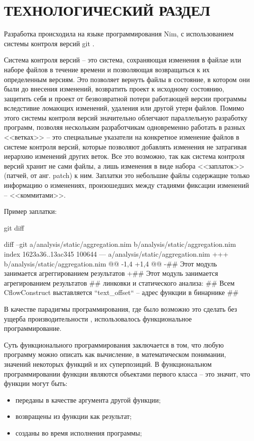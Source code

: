 \chapter{ТЕХНОЛОГИЧЕСКИЙ РАЗДЕЛ}\label{ch:ch3}
Разработка {\ProgModule} происходила на языке программирования Nim,
с использованием системы контроля версий git \autocite{git}.

Система контроля версий -- это система, сохраняющая
изменения в файлае или наборе файлов в течение времени и позволяющая возвращаться к их
определенным версиям. 
Это позволяет вернуть файлы в состояние, в котором они были до внесения изменений,
возвратить проект к исходному состоянию, защитить себя и проект от безвозвратной потери
работающей версии программы вследстивие ломающих изменений, удаления или другой утери файлов.
Помимо этого системы контроля версий значительно облегчают параллельную разработку программ,
позволяя нескольким разработчикам одновременно работать в разных <<ветках>> -- 
это специальные указатели на конкретное изменение файлов в системе контроля версий,
которые позволяют добавлять изменения не затрагивая иерархию изменений других веток.
Все это возможно, так как система контроля версий хранит не сами файлы, а лишь
изменения в виде набора <<заплаток>> (патчей, от анг. patch) к ним. Заплатки это небольшие файлы
содержащие только информацию о изменениях, произошедших между стадиями фиксации изменений -- 
<<коммитами>>.

Пример заплатки:
\hspace{-3ex}
\begin{ListingEnv}[!h]
    \captiondelim{ }
    \caption{git diff}\label{lst:diff}
    \small
    \begin{Verb}[]
    diff --git a/analysis/static/aggregation.nim b/analysis/static/aggregation.nim
    index 1623a36..13ac345 100644
    --- a/analysis/static/aggregation.nim
    +++ b/analysis/static/aggregation.nim
    @@ -1,4 +1,4 @@
    -## Этот модуль занимается агреггированием результатов
    +## Этот модуль занимается агрегированием результатов
     ## линковки и статического анализа:
     ## Всем CflowConstruct выставляется ``text_offset`` -- адрес функции в бинарнике
     ##
    \end{Verb}
\end{ListingEnv}

В качестве парадигмы программирования, где было возможно это сделать без
ущерба производительности {\ProgModule}, использовалось функциональное
программирование.

Суть функционального программирования заключается в том,
что любую программу можно описать как вычисление, в математическом понимании,
значений некоторых функций и их суперпозиций.
В функциональном программировании функции являются объектами первого
класса -- это значит, что функции могут быть:
\begin{itemize}
    \item переданы в качестве аргумента другой функции;
    \item возвращены из функции как результат;
    \item созданы во время исполнения программы;
\end{itemize}

